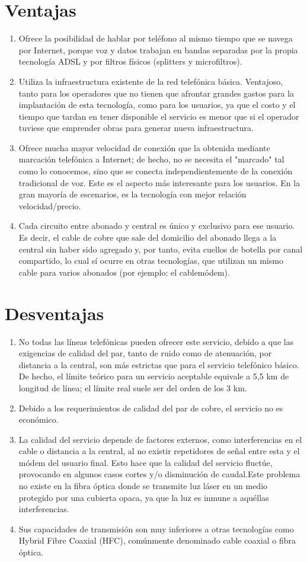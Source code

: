\documentclass{report}
\begin{document}
\section*{Ventajas}
\begin{enumerate}
\item Ofrece la posibilidad de hablar por teléfono al mismo tiempo que se navega por Internet, porque voz y datos trabajan en bandas separadas por la propia tecnología ADSL y por filtros físicos (splitters y microfiltros).
\item Utiliza la infraestructura existente de la red telefónica básica. Ventajoso, tanto para los operadores que no tienen que afrontar grandes gastos para la implantación de esta tecnología, como para los usuarios, ya que el costo y el tiempo que tardan en tener disponible el servicio es menor que si el operador tuviese que emprender obras para generar nueva infraestructura.
\item Ofrece mucha mayor velocidad de conexión que la obtenida mediante marcación telefónica a Internet; de hecho, no se necesita el "marcado" tal como lo conocemos, sino que se conecta independientemente de la conexión tradicional de voz. Este es el aspecto más interesante para los usuarios. En la gran mayoría de escenarios, es la tecnología con mejor relación velocidad/precio.
\item Cada circuito entre abonado y central es único y exclusivo para ese usuario. Es decir, el cable de cobre que sale del domicilio del abonado llega a la central sin haber sido agregado y, por tanto, evita cuellos de botella por canal compartido, lo cual sí ocurre en otras tecnologías, que utilizan un mismo cable para varios abonados (por ejemplo: el cablemódem).
\end{enumerate}
\section*{Desventajas}
\begin{enumerate}
\item No todas las líneas telefónicas pueden ofrecer este servicio, debido a que las exigencias de calidad del par, tanto de ruido como de atenuación, por distancia a la central, son más estrictas que para el servicio telefónico básico. De hecho, el límite teórico para un servicio aceptable equivale a 5,5 km de longitud de línea; el límite real suele ser del orden de los 3 km.
\item Debido a los requerimientos de calidad del par de cobre, el servicio no es económico.
\item La calidad del servicio depende de factores externos, como interferencias en el cable o distancia a la central, al no existir repetidores de señal entre esta y el módem del usuario final. Esto hace que la calidad del servicio fluctúe, provocando en algunos casos cortes y/o disminución de caudal.Este problema no existe en la fibra óptica donde se transmite luz láser en un medio protegido por una cubierta opaca, ya que la luz es inmune a aquéllas interferencias.
\item Sus capacidades de transmisión son muy inferiores a otras tecnologías como Hybrid Fibre Coaxial (HFC), comúnmente denominado cable coaxial o fibra óptica.
\end{enumerate}
\newpage
\end{document}
